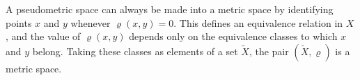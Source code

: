 A pseudometric space can always be made into a metric space by identifying points $x$ and $y$ whenever $\varrho(x, y) = 0$. This defines an equivalence relation in $X$, and the value of $\varrho(x, y)$ depends only on the equivalence classes to which $x$ and $y$ belong. Taking these classes as elements of a set $\tilde{X}$, the pair $(\tilde{X}, \varrho)$ is a metric space.
